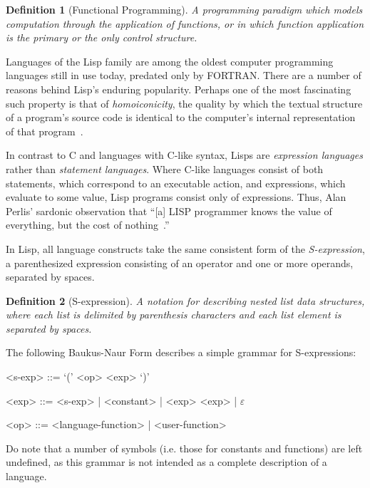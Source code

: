 \documentclass[11pt]{article}
\theoremstyle{break}
\newtheorem{defn}{Definition}
\begin{document}
\begin{defn}[Functional Programming]
A programming paradigm which models computation through the application of functions, or in which function application is the primary or the only control structure.
\end{defn}

Languages of the Lisp family are among the oldest computer programming languages still in use today, predated only by FORTRAN. There are a number of reasons behind Lisp's enduring popularity. Perhaps one of the most fascinating such property is that of \textit{homoiconicity}, the quality by which the textual structure of a program's source code is identical to the computer's internal representation of that program~\cite{vanderhart2010macros,sicp}.

In contrast to C and languages with C-like syntax, Lisps are \textit{expression languages} rather than \textit{statement languages}. Where C-like languages consist of both statements, which correspond to an executable action, and expressions, which evaluate to some value, Lisp programs consist only of expressions. Thus, Alan Perlis' sardonic observation that ``[a] LISP programmer knows the value of everything, but the cost of nothing~\cite{Perlis:1982:SFE:947955.1083808}.''

In Lisp, all language constructs take the same consistent form of the \textit{S-expression}, a parenthesized expression consisting of an operator and one or more operands, separated by spaces.

\begin{defn}[S-expression]
A notation for describing nested list data structures, where each list is delimited by parenthesis characters and each list element is separated by spaces.
\end{defn}

The following Baukus-Naur Form describes a simple grammar for S-expressions:
\begin{listing}[h]
\begin{grammar}
  <s-exp> ::= `(' <op> <exp> `)'

  <exp> ::= <s-exp>  | <constant> | <exp> <exp> | $\varepsilon$

  <op> ::= <language-function> | <user-function>
\end{grammar}
\end{listing}

Do note that a number of symbols (i.e. those for constants and functions) are left undefined, as this grammar is not intended as a complete description of a language.
\end{document}
